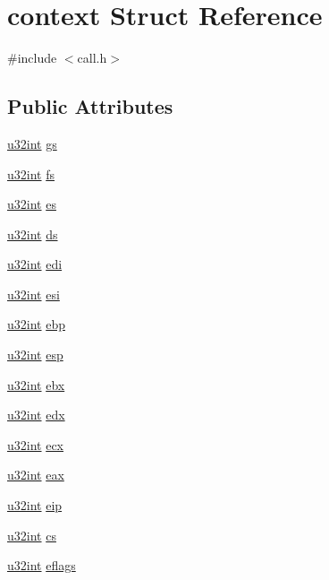 \hypertarget{structcontext}{}\section{context Struct Reference}
\label{structcontext}


{\ttfamily \#include $<$call.\+h$>$}

\subsection*{Public Attributes}
\begin{DoxyCompactItemize}
\item 
\hyperlink{system_8h_a757de76cafbcddaac0d1632902fe4cb8}{u32int} \hyperlink{structcontext_a54fa688ce896c5cca606323d33e1f68c}{gs}
\item 
\hyperlink{system_8h_a757de76cafbcddaac0d1632902fe4cb8}{u32int} \hyperlink{structcontext_a5e778314cc8c537f0a27726bfa673c8e}{fs}
\item 
\hyperlink{system_8h_a757de76cafbcddaac0d1632902fe4cb8}{u32int} \hyperlink{structcontext_aca480d54d4be09cb005dc21e4ff05da1}{es}
\item 
\hyperlink{system_8h_a757de76cafbcddaac0d1632902fe4cb8}{u32int} \hyperlink{structcontext_ae636622afec7fe9c8b18504168023d1e}{ds}
\item 
\hyperlink{system_8h_a757de76cafbcddaac0d1632902fe4cb8}{u32int} \hyperlink{structcontext_a2fd21838138987e11b4ff201b2e84b3b}{edi}
\item 
\hyperlink{system_8h_a757de76cafbcddaac0d1632902fe4cb8}{u32int} \hyperlink{structcontext_a736ce63e2112c400c59376b25af11068}{esi}
\item 
\hyperlink{system_8h_a757de76cafbcddaac0d1632902fe4cb8}{u32int} \hyperlink{structcontext_a7ed33e51ef51493c861cd20aa919f2f9}{ebp}
\item 
\hyperlink{system_8h_a757de76cafbcddaac0d1632902fe4cb8}{u32int} \hyperlink{structcontext_a5d56c844a4aa0dd6b7a7bf5b421cbf88}{esp}
\item 
\hyperlink{system_8h_a757de76cafbcddaac0d1632902fe4cb8}{u32int} \hyperlink{structcontext_aa1a5259f18285c424a8d38edd035f38b}{ebx}
\item 
\hyperlink{system_8h_a757de76cafbcddaac0d1632902fe4cb8}{u32int} \hyperlink{structcontext_a104da48ac40e0e3e94dfdfa7e7f0e8e9}{edx}
\item 
\hyperlink{system_8h_a757de76cafbcddaac0d1632902fe4cb8}{u32int} \hyperlink{structcontext_ad0067b404e6853bcf37d3f74a6f0294b}{ecx}
\item 
\hyperlink{system_8h_a757de76cafbcddaac0d1632902fe4cb8}{u32int} \hyperlink{structcontext_ab91accfc2d53d57c615cf40235a01889}{eax}
\item 
\hyperlink{system_8h_a757de76cafbcddaac0d1632902fe4cb8}{u32int} \hyperlink{structcontext_a48807bac5338e9bcd6183f2f2061400b}{eip}
\item 
\hyperlink{system_8h_a757de76cafbcddaac0d1632902fe4cb8}{u32int} \hyperlink{structcontext_a29cb887d9a426ddb24c04237bce5df6d}{cs}
\item 
\hyperlink{system_8h_a757de76cafbcddaac0d1632902fe4cb8}{u32int} \hyperlink{structcontext_a70a4605bd1b897c096f5cc7f730214db}{eflags}
\end{DoxyCompactItemize}


